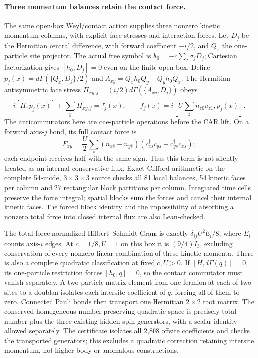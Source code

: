 \paragraph{Three momentum balances retain the contact force.}
The same open-box Weyl/contact action supplies three nonzero kinetic
momentum columns, with explicit face stresses and interaction forces.
Let $D_j$ be the Hermitian central difference, with forward coefficient
$-i/2$, and $Q_x$ the one-particle site projector.  The actual free symbol is
$h_0=-c\sum_j\sigma_jD_j$; Cartesian factorization gives
$[h_0,D_j]=0$ even on the finite open box.  Define
$p_j(x)=d\Gamma(\{Q_x,D_j\}/2)$ and
$A_{xy}=Q_xh_0Q_y-Q_yh_0Q_x$.  The Hermitian antisymmetric face stress
$\Pi_{xy,j}=(i/2)d\Gamma(\{A_{xy},D_j\})$ obeys
\[
 i[H,p_j(x)]+\sum_y\Pi_{xy,j}=f_j(x),\qquad
 f_j(x)=i[U\sum_z n_{z0}n_{z1},p_j(x)].
\]
The anticommutators here are one-particle operations before the CAR lift.
On a forward axis-$j$ bond, its full contact force is
\[
 F_{xy}=\frac U2\sum_s(n_{x\bar s}-n_{y\bar s})
       (c_{xs}^{\dagger}c_{ys}+c_{ys}^{\dagger}c_{xs});
\]
each endpoint receives half with the same sign.  Thus this term is not
silently treated as an internal conservative flux.  Exact Clifford
arithmetic on the complete 54-mode, $3\times3\times3$ source checks all
81 local balances, 54 kinetic faces per column and 27 rectangular block
partitions per column.  Integrated time cells preserve the force integral;
spatial blocks sum the forces and cancel their internal kinetic faces.
The forced block identity and the impossibility of absorbing a nonzero
total force into closed internal flux are also Lean-checked.

The total-force normalized Hilbert--Schmidt Gram is exactly
$\delta_{ij}U^2E_i/8$, where $E_i$ counts axis-$i$ edges.  At $c=1/8,U=1$
on this box it is $(9/4)I_3$, excluding conservation of every nonzero
linear combination of these kinetic momenta.  There is also a complete
quadratic classification at fixed $c,U>0$.  If
$[H,d\Gamma(q)]=0$, its one-particle restriction forces $[h_0,q]=0$,
so the contact commutator must vanish separately.  A two-particle matrix
element from one fermion at each of two sites to a doublon isolates each
intersite coefficient of $q$, forcing all of them to zero.  Connected
Pauli bonds then transport one Hermitian $2\times2$ root matrix.
The conserved homogeneous number-preserving quadratic space is precisely
total number plus the three existing hidden-spin generators, with a scalar
identity allowed separately.  The certificate isolates all 2,808 offsite
coefficients and checks the transported generators; this excludes a
quadratic correction retaining intersite momentum, not higher-body or
anomalous constructions.

